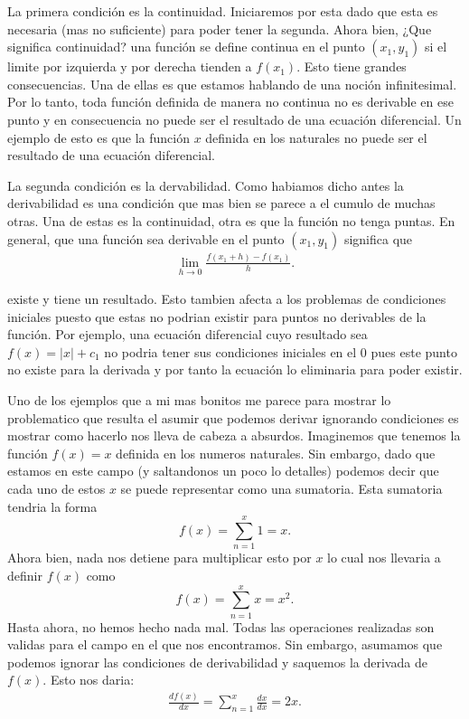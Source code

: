 \documentclass{report}
\begin{document}
La primera condición es la continuidad. Iniciaremos por esta dado que esta es necesaria (mas no suficiente) para poder tener la segunda. Ahora bien, ¿Que significa continuidad? una función se define continua en el punto $(x_1,y_1)$ si el limite por izquierda y por derecha tienden a  $f(x_1)$. Esto tiene grandes consecuencias. Una de ellas es que estamos hablando de una noción infinitesimal. Por lo tanto, toda función definida de manera no continua no es derivable en ese punto y en consecuencia no puede ser el resultado de una ecuación diferencial. Un ejemplo de esto es que la función $x$ definida en los naturales no puede ser el resultado de una ecuación diferencial.

La segunda condición es la dervabilidad. Como habiamos dicho antes la derivabilidad es una condición que mas bien se parece a el cumulo de muchas otras. Una de estas es la continuidad, otra es que la función no tenga puntas. En general, que una función sea derivable en el punto $(x_1,y_1)$ significa que 
\begin{align*}
    \lim_{h\to 0} \frac{f\left( x_1+h \right) - f\left( x_1 \right) }{h}
.\end{align*}

existe y tiene un resultado. Esto tambien afecta a los problemas de condiciones iniciales puesto que estas no podrian existir para puntos no derivables de la función. Por ejemplo, una ecuación diferencial cuyo resultado sea $f(x)=|x| + c_1$ no podria tener sus condiciones iniciales en el 0 pues este punto no existe para la derivada y por tanto la ecuación lo eliminaria para poder existir.

Uno de los ejemplos que a mi mas bonitos me parece para mostrar lo problematico que resulta el asumir que podemos derivar ignorando condiciones es mostrar como hacerlo nos lleva de cabeza a absurdos. Imaginemos que tenemos la función $f(x)=x$ definida en los numeros naturales. Sin embargo, dado que estamos en este campo (y saltandonos un poco lo detalles) podemos decir que cada uno de estos $x$ se puede representar como una sumatoria. Esta sumatoria tendria la forma \[
f\left( x \right) = \sum_{n=1}^{x} 1=x
.\] Ahora bien, nada nos detiene para multiplicar esto por $x$ lo cual nos llevaria a definir  $f\left( x \right) $ como \[
f\left( x \right) = \sum_{n=1}^{x} x = x^2
.\] Hasta ahora, no hemos hecho nada mal. Todas las operaciones realizadas son validas para el campo en el que nos encontramos. Sin embargo, asumamos que podemos ignorar las condiciones de derivabilidad y saquemos la derivada de $f(x)$. Esto nos daria:
 \begin{align*}
  \frac{d f(x)}{dx} = \sum_{n=1}^{x} \frac{dx}{dx} = 2x
.\end{align*}
\end{document}
